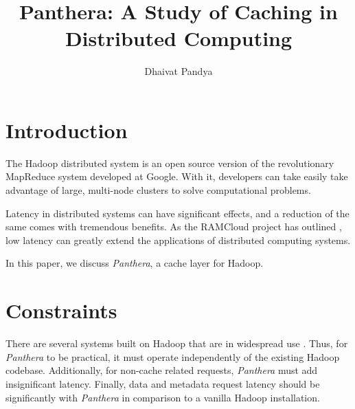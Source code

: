 \documentclass{article}
\title{Panthera: A Study of Caching in Distributed Computing}
\author{Dhaivat Pandya}
\date{}
\begin{document}
\maketitle


\section{Introduction}
The Hadoop distributed system \cite{hadoop} is an open source version of the revolutionary MapReduce system developed at Google. With it, developers can take easily take advantage of large, multi-node clusters to solve computational problems.

Latency in distributed systems can have significant effects, and a reduction of the same comes with tremendous benefits. As the RAMCloud project has outlined \cite{ramcloud}, low latency can greatly extend the applications of distributed computing systems. 

In this paper, we discuss \textit{Panthera}, a cache layer for Hadoop.

\section{Constraints}

There are several systems built on Hadoop that are in widespread use \cite{hbase, cloudbatch, pig}. Thus, for \textit{Panthera} to be practical, it must operate independently of the existing Hadoop codebase. Additionally, for non-cache related requests, \textit{Panthera} must add insignificant latency. Finally, data and metadata request latency should be significantly with \textit{Panthera} in comparison to a vanilla Hadoop installation.
\end{document}
